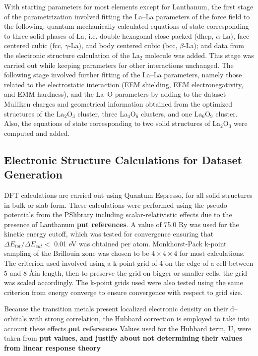 \documentclass[journal=jpcafh,manuscript=article]{achemso}
\begin{document}
With starting parameters for most elements except for Lanthanum, the first stage of the parametrization involved fitting the La--La parameters of the force field to the following: quantum mechanically calculated equations of state corresponding to three solid phases of La, i.e. double hexagonal close packed (dhcp, $\alpha$-La), face centered cubic (fcc, $\gamma$-La), and body centered cubic (bcc, $\beta$-La); and data from the electronic structure calculation of the La$_2$ molecule was added.
This stage was carried out while keeping parameters for other interactions unchanged.
The following stage involved further fitting of the La--La parameters, namely those related to the electrostatic interaction (EEM shielding, EEM electronegativity, and EMM hardness), and the La--O parameters by adding to the dataset Mulliken charges and geometrical information obtained from the optimized structures of the La$_2$O$_3$ cluster, three La$_4$O$_6$ clusters, and one La$_6$O$_9$ cluster.
Also, the equations of state corresponding to two solid structures of La$_2$O$_3$ were computed and added.


\subsection{Electronic Structure Calculations for Dataset Generation}
\label{sec:dft-details}

DFT calculations are carried out using Quantum Espresso,\cite{giannozzi_advanced_2017} for all solid structures in bulk or slab form.
These calculations were performed using the pseudo--potentials from the PSlibrary including scalar-relativistic effects due to the presence of Lanthanum \textbf{put references}.
A value of 75.0 Ry was used for the kinetic energy cutoff, which was tested for convergence ensuring that $\Delta E_{tot} / \Delta E_{cut} <$ 0.01 eV was obtained per atom.
Monkhorst-Pack k-point sampling of the Brillouin zone was chosen to be $4\times4\times4$ for most calculations.
The criterion used involved using a k-point grid of 4 on the edge of a cell between 5 and 8 \AA in length, then to preserve the grid on bigger or smaller cells, the grid was scaled accordingly.
The k-point grids used were also tested using the same criterion from energy converge to ensure convergence with respect to grid size.

Because the transition metals present localized electronic density on their d--orbitals with strong correlation, the Hubbard correction is employed to take into account these effects.\textbf{put references}
Values used for the Hubbard term, U, were taken from \textbf{put values, and justify about not determining their values from linear response theory}
\end{document}

